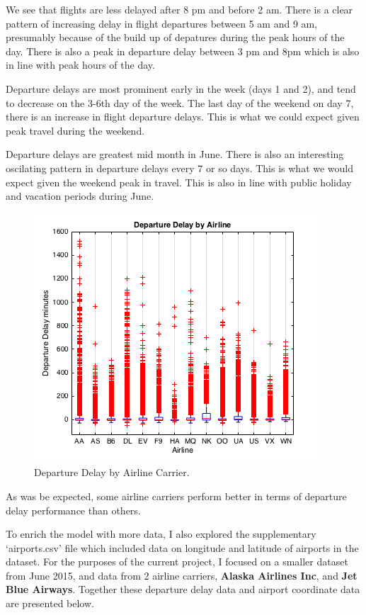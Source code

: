 \documentclass[a4paper, 10pt]{article}
\begin{document}
We see that flights are less delayed after 8 pm and before 2 am. There is a clear pattern of increasing delay in flight departures between 5 am and 9 am, presumably because of the build up of depatures during the peak hours of the day. There is also a peak in departure delay between 3 pm and 8pm which is also in line with peak hours of the day.

\vspace{5mm}
Departure delays are most prominent early in the week (days 1 and 2), and tend to decrease on the 3-6th day of the week. The last day of the weekend on day 7, there is an increase in flight departure delays. This is what we could expect given peak travel during the weekend.

\vspace{5mm}
Departure delays are greatest mid month in June. There is also an interesting oscilating pattern in departure delays every 7 or so days. This is what we would expect given the weekend peak in travel. This is also in line with public holiday and vacation periods during June.

\begin{figure}[H]
\begin{center}
\includegraphics[scale=0.5]{departureDelayByAirline}
\caption{Departure Delay by Airline Carrier.}
\label{departureDelayByAirline}
\end{center}
\end{figure}

As was be expected, some airline carriers perform better in terms of departure delay performance than others.

\clearpage
To enrich the model with more data, I also explored the supplementary `airports.csv' file which included data on longitude and latitude of airports in the dataset. For the purposes of the current project, I focused on a smaller dataset from June 2015, and data from 2 airline carriers, \textbf{Alaska Airlines Inc}, and \textbf{Jet Blue Airways}. Together these departure delay data and airport coordinate data are presented below.
\end{document}
